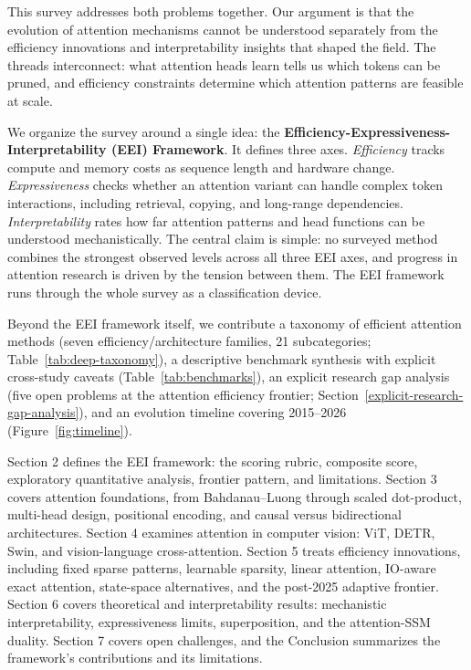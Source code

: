 \documentclass[10pt,twocolumn]{article}
\begin{document}
This survey addresses both problems together. Our argument is that the evolution of attention mechanisms cannot be understood separately from the efficiency innovations and interpretability insights that shaped the field. The threads interconnect: what attention heads learn tells us which tokens can be pruned, and efficiency constraints determine which attention patterns are feasible at scale.

We organize the survey around a single idea: the \textbf{Efficiency-Expressiveness-Interpretability (EEI) Framework}. It defines three axes. \emph{Efficiency} tracks compute and memory costs as sequence length and hardware change. \emph{Expressiveness} checks whether an attention variant can handle complex token interactions, including retrieval, copying, and long-range dependencies. \emph{Interpretability} rates how far attention patterns and head functions can be understood mechanistically. The central claim is simple: no surveyed method combines the strongest observed levels across all three EEI axes, and progress in attention research is driven by the tension between them. The EEI framework runs through the whole survey as a classification device.

Beyond the EEI framework itself, we contribute a taxonomy of efficient attention methods (seven efficiency/architecture families, 21 subcategories; Table~\ref{tab:deep-taxonomy}), a descriptive benchmark synthesis with explicit cross-study caveats (Table~\ref{tab:benchmarks}), an explicit research gap analysis (five open problems at the attention efficiency frontier; Section~\ref{explicit-research-gap-analysis}), and an evolution timeline covering 2015--2026 (Figure~\ref{fig:timeline}).

Section 2 defines the EEI framework: the scoring rubric, composite score, exploratory quantitative analysis, frontier pattern, and limitations. Section 3 covers attention foundations, from Bahdanau--Luong through scaled dot-product, multi-head design, positional encoding, and causal versus bidirectional architectures. Section 4 examines attention in computer vision: ViT, DETR, Swin, and vision-language cross-attention. Section 5 treats efficiency innovations, including fixed sparse patterns, learnable sparsity, linear attention, IO-aware exact attention, state-space alternatives, and the post-2025 adaptive frontier. Section 6 covers theoretical and interpretability results: mechanistic interpretability, expressiveness limits, superposition, and the attention-SSM duality. Section 7 covers open challenges, and the Conclusion summarizes the framework's contributions and its limitations.
\end{document}
